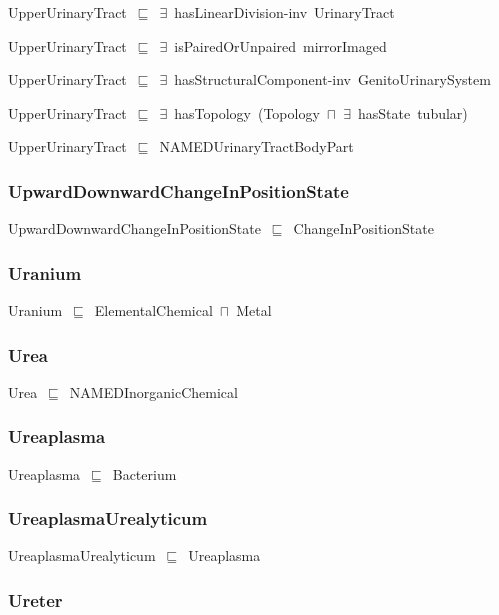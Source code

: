 \documentclass{article}
\begin{document}
UpperUrinaryTract~\ensuremath{\sqsubseteq}~\ensuremath{\exists}~hasLinearDivision-inv~UrinaryTract~

UpperUrinaryTract~\ensuremath{\sqsubseteq}~\ensuremath{\exists}~isPairedOrUnpaired~mirrorImaged~

UpperUrinaryTract~\ensuremath{\sqsubseteq}~\ensuremath{\exists}~hasStructuralComponent-inv~GenitoUrinarySystem~

UpperUrinaryTract~\ensuremath{\sqsubseteq}~\ensuremath{\exists}~hasTopology~(Topology~\ensuremath{\sqcap}~\ensuremath{\exists}~hasState~tubular)~

UpperUrinaryTract~\ensuremath{\sqsubseteq}~NAMEDUrinaryTractBodyPart~

\subsubsection*{UpwardDownwardChangeInPositionState}

UpwardDownwardChangeInPositionState~\ensuremath{\sqsubseteq}~ChangeInPositionState~

\subsubsection*{Uranium}

Uranium~\ensuremath{\sqsubseteq}~ElementalChemical~\ensuremath{\sqcap}~Metal~

\subsubsection*{Urea}

Urea~\ensuremath{\sqsubseteq}~NAMEDInorganicChemical~

\subsubsection*{Ureaplasma}

Ureaplasma~\ensuremath{\sqsubseteq}~Bacterium~

\subsubsection*{UreaplasmaUrealyticum}

UreaplasmaUrealyticum~\ensuremath{\sqsubseteq}~Ureaplasma~

\subsubsection*{Ureter}
\end{document}
